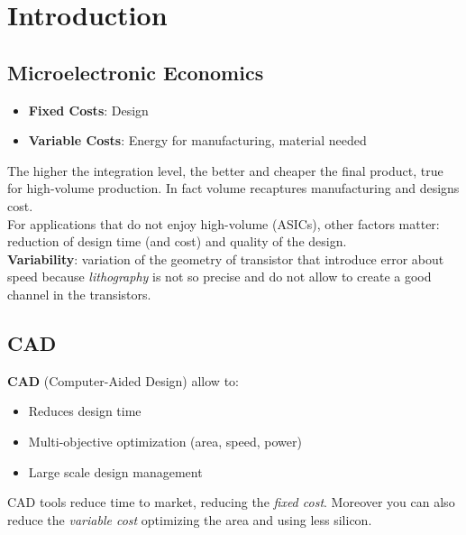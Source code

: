 \section{Introduction}

\subsection{Microelectronic Economics}
\begin{itemize}
\item \textbf{Fixed Costs}: Design
\item \textbf{Variable Costs}: Energy for manufacturing, material needed
\end{itemize}
The higher the integration level, the better and cheaper the final product, true for high-volume production. In fact volume recaptures manufacturing and designs cost.
\bigskip \\
For applications that do not enjoy high-volume (ASICs), other factors matter: reduction of design time (and cost) and quality of the design.
\bigskip \\
\textbf{Variability}: variation of the geometry of transistor that introduce error about speed because \textit{lithography} is not so precise and do not allow to create a good channel in the transistors.

\subsection{CAD}
\textbf{CAD} (Computer-Aided Design) allow to:
\begin{itemize}
\item Reduces design time
\item Multi-objective optimization (area, speed, power)
\item Large scale design management
\end{itemize}
CAD tools reduce time to market, reducing the \textit{fixed cost}. Moreover you can also reduce the \textit{variable cost} optimizing the area and using less silicon.

